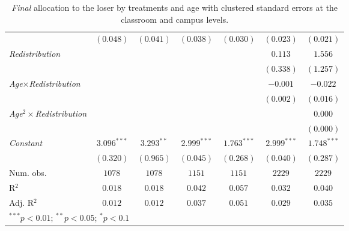 \begin{table}[H]
\begin{center}
\begin{footnotesize}
\begin{tabular}{l c c c c c c}
                                              & $(0.048)$     & $(0.041)$     & $(0.038)$     & $(0.030)$     & $(0.023)$     & $(0.021)$     \\
\textit{Redistribution}                       &               &               &               &               & $0.113$       & $1.556$       \\
                                              &               &               &               &               & $(0.338)$     & $(1.257)$     \\
\textit{Age}$\times$\textit{Redistribution}   &               &               &               &               & $-0.001$      & $-0.022$      \\
                                              &               &               &               &               & $(0.002)$     & $(0.016)$     \\
\textit{Age}$^2\times$\textit{Redistribution} &               &               &               &               &               & $0.000$       \\
                                              &               &               &               &               &               & $(0.000)$     \\
\textit{Constant}                             & $3.096^{***}$ & $3.293^{**}$  & $2.999^{***}$ & $1.763^{***}$ & $2.999^{***}$ & $1.748^{***}$ \\
                                              & $(0.320)$     & $(0.965)$     & $(0.045)$     & $(0.268)$     & $(0.040)$     & $(0.287)$     \\
\midrule
Num. obs.                                     & $1078$        & $1078$        & $1151$        & $1151$        & $2229$        & $2229$        \\
R$^2$                                         & $0.018$       & $0.018$       & $0.042$       & $0.057$       & $0.032$       & $0.040$       \\
Adj. R$^2$                                    & $0.012$       & $0.012$       & $0.037$       & $0.051$       & $0.029$       & $0.035$       \\
\bottomrule
\multicolumn{7}{l}{\footnotesize{$^{***}p<0.01$; $^{**}p<0.05$; $^{*}p<0.1$}}
\end{tabular}
\end{footnotesize}
\caption{\textit{Final} allocation to the loser by treatments and age with clustered standard errors at the classroom and campus levels.}
\label{table-b3-final-both}
\end{center}
\end{table}

